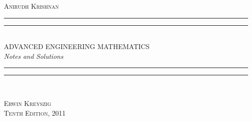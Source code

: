 \begin{titlepage}
	\centering
	\settowidth{\unitlength}{\LARGE AAADVANCED ENGINEERING MATHEMATICSAA}
	\vspace*{\baselineskip}
	{\large\scshape Anirudh Krishnan}\\[\baselineskip]
	\rule{\unitlength}{1.6pt}\vspace*{-\baselineskip}\vspace*{2pt}
	\rule{\unitlength}{0.4pt}\\[\baselineskip]
	{\LARGE ADVANCED ENGINEERING MATHEMATICS}\\[\baselineskip]
	{\itshape Notes and Solutions}\\[0.2\baselineskip]
	\rule{\unitlength}{0.4pt}\vspace*{-\baselineskip}\vspace{3.2pt}
	\rule{\unitlength}{1.6pt}\\[\baselineskip]
	\par
	\vfill
	{\large\scshape Erwin Kreyszig}\\[\baselineskip]
	{\small\scshape Tenth Edition, 2011}\par
	\vspace*{0.1\textheight}
\end{titlepage}
